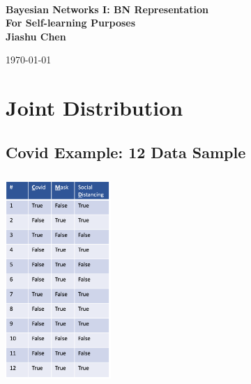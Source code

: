 \documentclass[11pt,a4paper]{report}
\newcommand{\school}{}
\newcommand{\degree}{}
\newcommand{\projtitle}{Bayesian Networks I: BN Representation}
\newcommand{\subtitle}{For Self-learning Purposes}
\newcommand{\projauthor}{Jiashu Chen}
\begin{document}
\setcounter{page}{1}
\pagestyle{plain}


\begin{titlepage}
\center

\vspace{-15mm}
{\large \textbf{\textsc{\school}}}\\

\vfill

{\Large \textbf{\projtitle}}\\[8mm]
{\large \textbf{\subtitle}}\\[28mm]

{\Large \textbf{\projauthor}}\\

\vfill


\vfill

\today

\end{titlepage}


\tableofcontents


\chapter{Joint Distribution}

\pagestyle{fancy}
\setcounter{page}{1}

\section{Covid Example: 12 Data Sample}

\begin{center}
    \includegraphics[width=4cm, height=8cm]{covid_3var.png}
\end{center}
\end{document}
